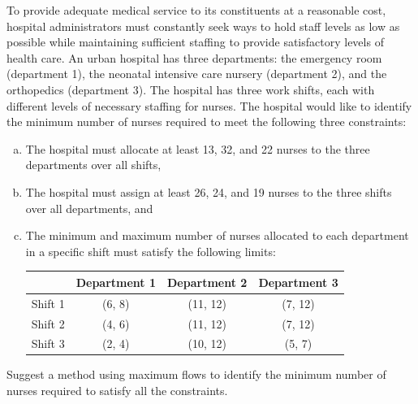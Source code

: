 \documentclass[fleqn]{homework}
\begin{document}
  \maketitle

  \begin{problem}{1}
    \begin{question}
      To provide adequate medical service to its constituents at a reasonable
      cost, hospital administrators must constantly seek ways to hold staff
      levels as low as possible while maintaining sufficient staffing to provide
      satisfactory levels of health care.  An urban hospital has three
      departments: the emergency room (department 1), the neonatal intensive
      care nursery (department 2), and the orthopedics (department 3). The
      hospital has three work shifts, each with different levels of necessary
      staffing for nurses. The hospital would like to identify the minimum
      number of nurses required to meet the following three constraints:

      \begin{enumerate}[a.]
      \item The hospital must allocate at least 13, 32, and 22 nurses to the
        three departments over all shifts,
      \item The hospital must assign at least 26, 24, and 19 nurses to the three
        shifts over all departments, and
      \item The minimum and maximum number of nurses allocated to each
        department in a specific shift must satisfy the following limits:

        \begin{tabular}{|l|ccc|}
          \hline
          & Department 1 & Department 2 & Department 3 \\
          \hline
          Shift 1 & (6, 8) & (11, 12) & (7, 12) \\
          Shift 2 & (4, 6) & (11, 12) & (7, 12) \\
          Shift 3 & (2, 4) & (10, 12) & (5, 7) \\
          \hline
        \end{tabular}
      \end{enumerate}

      Suggest a method using maximum flows to identify the minimum number of
      nurses required to satisfy all the constraints.
    \end{question}
  \end{problem}
\end{document}
